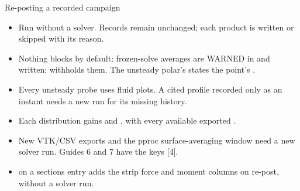\begin{frame}{Re-posting a recorded campaign}
\begin{itemize}\small
  \item Run  without a solver.
        Records remain unchanged; each product is written or skipped with its reason.
  \item Nothing blocks by default: frozen-solve averages are
        WARNED in  and written;  withholds
        them. The unsteady polar's  states the point's .
  \item Every unsteady probe uses fluid plots. A cited profile recorded only
        as an instant needs a new run for its missing history.
  \item Each distribution gains  and
        , with every available exported .
  \item New VTK/CSV exports and the pproc surface-averaging window need a new
        solver run. Guides 6 and 7 have the keys [4].
  \item {} on a sections entry adds the
        strip force and moment columns on re-post, without a solver run.
\end{itemize}
\end{frame}
